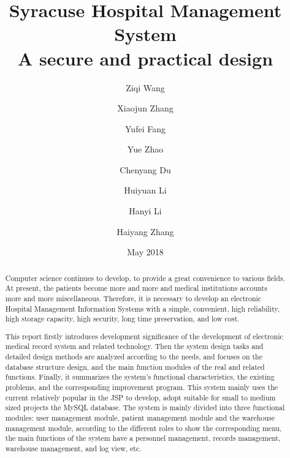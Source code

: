 \documentclass[12pt]{article}
\title{Syracuse Hospital Management System\\
\large A secure and practical design\vspace{5cm}}
\author{Ziqi Wang\and Xiaojun Zhang \and Yufei Fang \and Yue Zhao \and Chenyang Du \and	Huiyuan Li \and Hanyi Li \and Haiyang Zhang }
\date{May 2018}
\begin{document}
\maketitle
\newpage
\tableofcontents
\newpage

\begin{abstract}
    Computer science continues to develop, to provide a great convenience to various fields. At present, the patients become more and more and medical institutions accounts more and more miscellaneous. Therefore, it is necessary to develop an electronic Hospital Management Information Systems with a simple, convenient, high reliability, high storage capacity, high security, long time preservation, and low cost. 
    
    This report firstly introduces development significance of the development of electronic medical record system and related technology. Then the system design tasks and detailed design methods are analyzed according to the needs, and focuses on the database structure design, and the main function modules of the real and related functions. Finally, it summarizes the system’s functional characteristics, the existing problems, and the corresponding improvement program. This system mainly uses the current relatively popular in the JSP to develop, adopt suitable for small to medium sized projects the MySQL database. The system is mainly divided into three functional modules: user management module, patient management module and the warehouse management module, according to the different roles to show the corresponding menu, the main functions of the system have a personnel management, records management, warehouse management, and log view, etc.
\end{abstract}
\newpage








\end{document}
